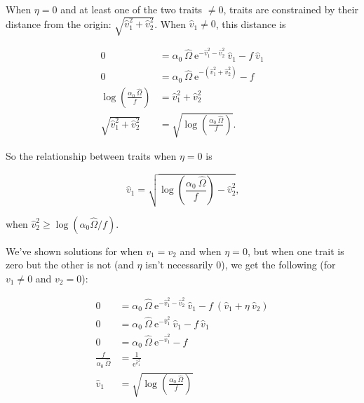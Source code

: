 When $\eta = 0$ and at least one of the two traits $\ne 0$,
traits are constrained by their distance
from the origin: $\sqrt{\hat{v}_{1}^2 + \hat{v}_{2}^2}$.
When $\hat{v}_{1} \ne 0$, this distance is

\begin{equation*}
\begin{split}
    0 &= \alpha_0 ~ \hat{\Omega} ~
            \textrm{e}^{-\hat{v}_{1}^2 - \hat{v}_{2}^2} ~ \hat{v}_{1}
        - f ~ \hat{v}_{1} \\
    0 &= \alpha_0 ~ \hat{\Omega} ~
        \textrm{e}^{- ( \hat{v}_{1}^2 + \hat{v}_{2}^2) }
        - f \\
    \log \left( \frac{\alpha_0 ~ \hat{\Omega}}{ f } \right) &=
        \hat{v}_{1}^2 + \hat{v}_{2}^2 \\
     \sqrt{ \hat{v}_{1}^2 + \hat{v}_{2}^2 } &=
        \sqrt{ \log \left( \frac{\alpha_0 ~ \hat{\Omega}}{ f } \right)}
    \textrm{.}
\end{split}
\end{equation*}

\noindent So the relationship between traits when $\eta = 0$ is

$$
    \hat{v}_{1} =
    \sqrt{
        \log \left( \frac{\alpha_0 ~ \hat{\Omega}}{ f } \right) -
        \hat{v}_{2}^2
    }
    \textrm{,}
$$

\noindent when $\hat{v}_{2}^2 \ge \log (\alpha_0 \hat{\Omega} / f)$.

We've shown solutions for when $v_1 = v_2$ and when $\eta = 0$, but
when one trait is zero but the other is not (and $\eta$ isn't necessarily 0),
we get the following (for $v_1 \ne 0$ and $v_2 = 0$):

\begin{equation}
\begin{split}
    0 &=
        \alpha_0 ~ \hat{\Omega} ~
            \textrm{e}^{-\hat{v}_{1}^2 - \hat{v}_{2}^2} ~ \hat{v}_{1}
        - f ~ ( \hat{v}_{1} + \eta ~ \hat{v}_{2} ) \\
    0 &=
        \alpha_0 ~ \hat{\Omega} ~
            \textrm{e}^{-\hat{v}_{1}^2} ~ \hat{v}_{1}
        - f ~ \hat{v}_{1} \\
    0 &=
        \alpha_0 ~ \hat{\Omega} ~
            \textrm{e}^{-\hat{v}_{1}^2} - f \\
    \frac{f}{\alpha_0 ~ \hat{\Omega}} &=
         \frac{1}{\textrm{e}^{\hat{v}_{1}^2}} \\
    \hat{v}_{1} &= \sqrt{ \log \left( \frac{\alpha_0 ~ \hat{\Omega}}{f} \right) }
\end{split}
\label{eq:two-traits-v1-nonzero-v2-zero}
\end{equation}







